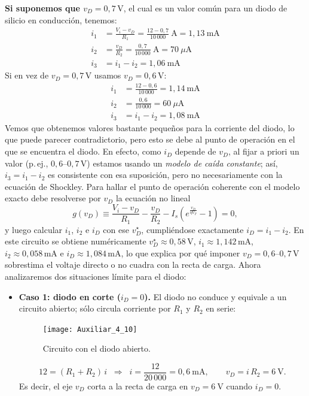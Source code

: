 \documentclass[
  11pt,
  letterpaper,
   addpoints,
   answers
  ]{exam}
\begin{document}
\begin{questions}
\begin{solution}
\textbf{Si suponemos que $v_D = 0{,}7\,\mathrm{V}$}, el cual es un valor común para un diodo de silicio en conducción, tenemos:
\begin{align*}
    i_1 &= \frac{V_i - v_D}{R_1} = \frac{12 - 0{,}7}{10\,000}\ \mathrm{A} = 1{,}13\ \mathrm{mA} \\
    i_2 &= \frac{v_D}{R_2} = \frac{0{,}7}{10\,000}\ \mathrm{A} = 70\ \mu\mathrm{A} \\
    i_3 &= i_1 - i_2 = 1{,}06\ \mathrm{mA}
\end{align*}
Si en vez de $v_D = 0{,}7\,\mathrm{V}$ usamos $v_D = 0{,}6\,\mathrm{V}$:
\begin{align*}
    i_1 &= \frac{12 - 0{,}6}{10\,000} = 1{,}14\ \mathrm{mA} \\
    i_2 &= \frac{0{,}6}{10\,000} = 60\ \mu\mathrm{A} \\
    i_3 &= i_1 - i_2 = 1{,}08\ \mathrm{mA}
\end{align*}
Vemos que obtenemos valores bastante pequeños para la corriente del diodo, lo que puede parecer contradictorio, pero esto se debe al punto de operación en el que se encuentra el diodo. En efecto, como $i_D$ depende de $v_D$, al fijar a priori un valor (p.\,ej., $0{,}6$–$0{,}7\,\mathrm{V}$) estamos usando un \emph{modelo de caída constante}; así, $i_3=i_1-i_2$ es consistente con esa suposición, pero no necesariamente con la ecuación de Shockley. Para hallar el punto de operación coherente con el modelo exacto debe resolverse por $v_D$ la ecuación no lineal
\[
g(v_D)\equiv \frac{V_i-v_D}{R_1}-\frac{v_D}{R_2}-I_s\!\left(e^{\frac{v_D}{\eta V_T}}-1\right)=0,
\]
y luego calcular $i_1$, $i_2$ e $i_D$ con ese $v_D^\star$, cumpliéndose exactamente $i_D=i_1-i_2$. En este circuito se obtiene numéricamente $v_D^\star\approx 0{,}58\,\mathrm{V}$, $i_1\approx 1{,}142\,\mathrm{mA}$, $i_2\approx 0{,}058\,\mathrm{mA}$ e $i_D\approx 1{,}084\,\mathrm{mA}$, lo que explica por qué imponer $v_D=0{,}6$–$0{,}7\,\mathrm{V}$ sobrestima el voltaje directo o no cuadra con la recta de carga. Ahora analizaremos dos situaciones límite para el diodo:
\begin{itemize}
  \item \textbf{Caso 1: diodo en corte ($i_D=0$).} El diodo no conduce y equivale a un circuito abierto; sólo circula corriente por $R_1$ y $R_2$ en serie:
  \begin{figure}[H]
    \centering
    \texttt{[image: Auxiliar\_4\_10]}
    \caption{Circuito con el diodo abierto.}
    \label{fig:th_norton_2}
  \end{figure}
  \vspace{-0.6em}
  \[
    12 = (R_1+R_2)\,i
    \;\;\Rightarrow\;\;
    i=\frac{12}{20\,000}=0{,}6~\mathrm{mA},
    \qquad
    v_D = i\,R_2 = 6~\mathrm{V}.
  \]
  Es decir, el eje $v_D$ corta a la recta de carga en $v_D=6~\mathrm{V}$ cuando $i_D=0$.


\end{itemize}
\end{solution}
\end{questions}
\end{document}
